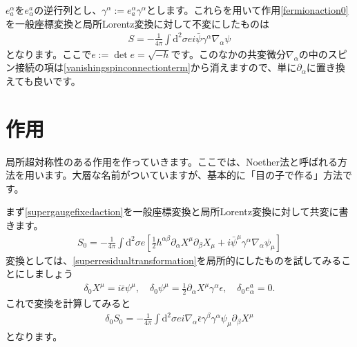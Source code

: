 \documentclass[report,paper=a4, fontsize=12pt, line_length=16cm, number_of_lines=34,dvipdfmx]{jlreq}
\numberwithin{equation}{chapter}
\numberwithin{equation}{section}
\newcommand{\del}{\partial}
\newcommand{\di}{\mathrm{d}}
\newcommand{\psib}{\bar{\psi}}
\newcommand{\epsilonb}{\bar{\epsilon}}
\begin{document}
$e_{a}^{\alpha}$を$e^{a}_{\alpha}$の逆行列とし、$\gamma^{\alpha}:=e^{\alpha}_{a}\gamma^{\alpha}$とします。これらを用いて作用\eqref{fermionaction0}を一般座標変換と局所Lorentz変換に対して不変にしたものは
\begin{align}
  S=-\frac{1}{4\pi}\int \di^2 \sigma e i\psib \gamma^{\alpha}\nabla_{\alpha}\psi
\end{align}
となります。ここで$e:=\det e=\sqrt{-h}$です。このなかの共変微分$\nabla_{\alpha}$の中のスピン接続の項は\eqref{vanishingspinconnectionterm}から消えますので、単に$\del_{\alpha}$に置き換えても良いです。

\section{作用}
局所超対称性のある作用を作っていきます。ここでは、Noether法と呼ばれる方法を用います。大層な名前がついていますが、基本的に「目の子で作る」方法です。

まず\eqref{supergaugefixedaction}を一般座標変換と局所Lorentz変換に対して共変に書きます。
\begin{align}
  S_0=-\frac{1}{4\pi}\int \di^2\sigma e\left[ 
    \frac12 h^{\alpha\beta}\del_{\alpha}X^{\mu}\del_{\beta}X_{\mu}
    +i\psib^{\mu}\gamma^{\alpha}\nabla_{\alpha}\psi_{\mu}
   \right]
\end{align}
変換としては、\eqref{superresidualtransformation}を局所的にしたものを試してみることにしましょう
\begin{align}
  \delta_{0}X^{\mu}=i\epsilonb \psi^{\mu},\quad
  \delta_{0}\psi^{\mu}=\frac12 \del_{\alpha}X^{\mu}\gamma^{\alpha}\epsilon,\quad
  \delta_{0}e^{a}_{\alpha}=0.
\end{align}
これで変換を計算してみると
\begin{align}
  \delta_{0}S_{0}=-\frac{1}{4\pi}\int \di^2 \sigma e i
  \nabla_{\alpha}\epsilonb\gamma^{\beta}\gamma^{\alpha}\psi_{\mu}\del_{\beta}X^{\mu}\label{tempdelta0S0}
\end{align}
となります。
\end{document}
